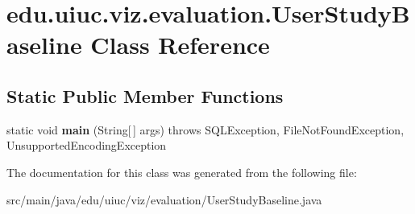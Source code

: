 \hypertarget{classedu_1_1uiuc_1_1viz_1_1evaluation_1_1_user_study_baseline}{}\section{edu.\+uiuc.\+viz.\+evaluation.\+User\+Study\+Baseline Class Reference}
\label{classedu_1_1uiuc_1_1viz_1_1evaluation_1_1_user_study_baseline}
\subsection*{Static Public Member Functions}
\begin{DoxyCompactItemize}
\item 
\mbox{\label{classedu_1_1uiuc_1_1viz_1_1evaluation_1_1_user_study_baseline_a04489d65ec17afb8d37528b93f9fc2f9}} 
static void {\bfseries main} (String\mbox{[}$\,$\mbox{]} args)  throws S\+Q\+L\+Exception, File\+Not\+Found\+Exception, Unsupported\+Encoding\+Exception  	
\end{DoxyCompactItemize}


The documentation for this class was generated from the following file\+:\begin{DoxyCompactItemize}
\item 
src/main/java/edu/uiuc/viz/evaluation/User\+Study\+Baseline.\+java\end{DoxyCompactItemize}
